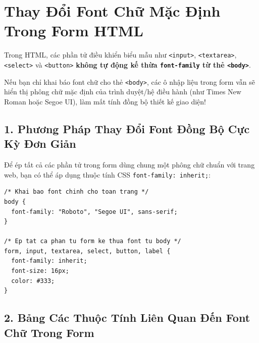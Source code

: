 \documentclass[11pt,oneside]{book}
\newcommand{\codeinline}[1]{\textcolor{accentOrange}{\texttt{#1}}}
\begin{document}
\section{Thay Đổi Font Chữ Mặc Định Trong Form HTML}
\label{sec:form_font_customization}

\begin{conceptBox}
Trong HTML, các phần tử điều khiển biểu mẫu như \codeinline{<input>}, \codeinline{<textarea>}, \codeinline{<select>} và \codeinline{<button>} \textbf{không tự động kế thừa \codeinline{font-family} từ thẻ \codeinline{<body>}}.
\par\vspace{4pt}
Nếu bạn chỉ khai báo font chữ cho thẻ \codeinline{<body>}, các ô nhập liệu trong form vẫn sẽ hiển thị phông chữ mặc định của trình duyệt/hệ điều hành (như Times New Roman hoặc Segoe UI), làm mất tính đồng bộ thiết kế giao diện!
\end{conceptBox}

\subsection{1. Phương Pháp Thay Đổi Font Đồng Bộ Cực Kỳ Đơn Giản}
Để ép tất cả các phần tử trong form dùng chung một phông chữ chuẩn với trang web, bạn có thể áp dụng thuộc tính CSS \codeinline{font-family: inherit;}:

\begin{codeWindow}
\begin{lstlisting}[language=HTML5]
/* Khai bao font chinh cho toan trang */
body {
  font-family: "Roboto", "Segoe UI", sans-serif;
}

/* Ep tat ca phan tu form ke thua font tu body */
form, input, textarea, select, button, label {
  font-family: inherit;
  font-size: 16px;
  color: #333;
}
\end{lstlisting}
\end{codeWindow}

\subsection{2. Bảng Các Thuộc Tính Liên Quan Đến Font Chữ Trong Form}
\end{document}

